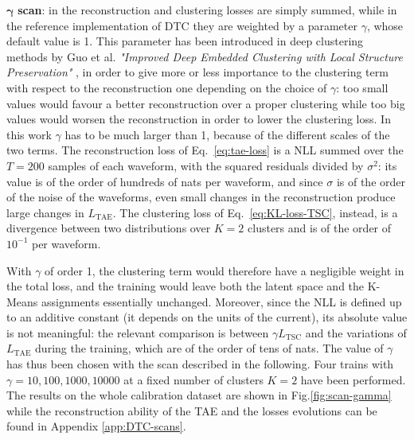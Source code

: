 $\boldsymbol{\gamma}$ \textbf{scan}: in \cite{DTC} the reconstruction and clustering losses are simply summed, while in the reference implementation of \ac{DTC} they are weighted by a parameter $\gamma$, whose default value is 1. This parameter has been introduced in deep clustering methods by Guo et al. \textit{"Improved Deep Embedded Clustering with Local Structure Preservation"} \cite{IDEC}, in order to give more or less importance to the clustering term with respect to the reconstruction one depending on the choice of $\gamma$: too small values would favour a better reconstruction over a proper clustering while too big values would worsen the reconstruction in order to lower the clustering loss. In this work $\gamma$ has to be much larger than 1, because of the different scales of the two terms. The reconstruction loss of Eq.~\ref{eq:tae-loss} is a \ac{NLL} summed over the $T = 200$ samples of each waveform, with the squared residuals divided by $\sigma^2$: its value is of the order of hundreds of nats per waveform, and since $\sigma$ is of the order of the noise of the waveforms, even small changes in the reconstruction produce large changes in $L_\text{TAE}$. The clustering loss of Eq.~\ref{eq:KL-loss-TSC}, instead, is a divergence between two distributions over $K = 2$ clusters and is of the order of $10^{-1}$ per waveform. 

With $\gamma$ of order 1, the clustering term would therefore have a negligible weight in the total loss, and the training would leave both the latent space and the K-Means assignments essentially unchanged. Moreover, since the \ac{NLL} is defined up to an additive constant (it depends on the units of the current), its absolute value is not meaningful: the relevant comparison is between $\gamma L_\text{TSC}$ and the variations of $L_\text{TAE}$ during the training, which are of the order of tens of nats. The value of $\gamma$ has thus been chosen with the scan described in the following. Four trains with $\gamma = 10, 100, 1000, 10000$ at a fixed number of clusters $K=2$ have been performed. The results on the whole calibration dataset are shown in Fig.\ref{fig:scan-gamma} while the reconstruction ability of the \ac{TAE} and the losses evolutions can be found in Appendix \ref{app:DTC-scans}.

